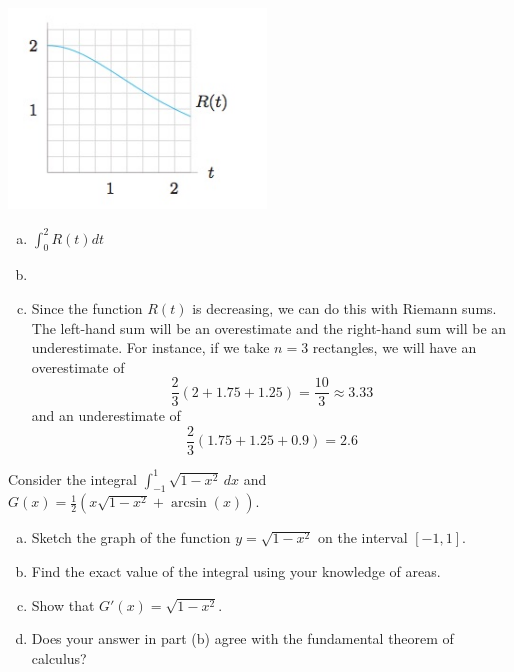 \documentclass[11pt]{exam}
\begin{document}
\begin{questions}
\begin{multicols}{2}
    \includegraphics[width=2.7in]{Figures/no21graph.jpg}
  \end{multicols}
  \begin{solution}
    \begin{enumerate}[(a)]
    \item \(\int_0^2 R(t) dt\)
    \item 
    \item Since the function \(R(t)\) is decreasing, we can do this
      with Riemann sums. The left-hand sum will be an overestimate and
      the right-hand sum will be an underestimate. For instance, if we
      take \(n=3\) rectangles, we will have an overestimate of \[
        \frac{2}{3}\left( 2 + 1.75+1.25 \right) = \frac{10}{3} \approx 3.33
      \]
      and an underestimate of \[
       \frac{2}{3}\left( 1.75 + 1.25 + 0.9 \right) = 2.6
      \]
    \end{enumerate}
  \end{solution}
\question Consider the integral $\displaystyle\int_{-1}^1 \sqrt{1-x^2} \, dx$ and $\displaystyle G(x) = \frac{1}{2}\left(x\sqrt{1-x^2}+\arcsin(x)\right)$.
\begin{enumerate}[(a)]
	\item Sketch the graph of the function $y = \sqrt{1-x^2}$ on the interval $[-1,1]$.
	\item Find the exact value of the integral using your knowledge of areas.
	\item Show that $G'(x)=\sqrt{1-x^2}$.
	\item Does your answer in part (b) agree with the fundamental theorem of calculus? 
\end{enumerate}	
\begin{solution}

\end{solution}
\end{questions}
\end{document}
